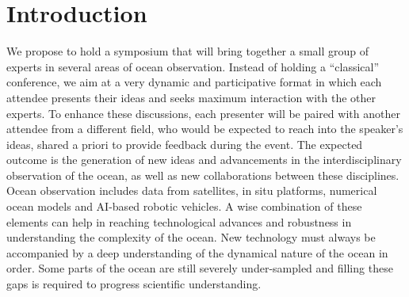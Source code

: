 \section{Introduction}

We propose to hold a symposium that will bring together a small group of
experts in several areas of ocean observation. Instead of holding a
“classical” conference, we aim at a very dynamic and participative
format in which each attendee presents their ideas and seeks maximum
interaction with the other experts. To enhance these discussions, each
presenter will be paired with another attendee from a different field,
who would be expected to reach into the speaker’s ideas, shared a priori
to provide feedback during the event. The expected outcome is the
generation of new ideas and advancements in the interdisciplinary
observation of the ocean, as well as new collaborations between these
disciplines. Ocean observation includes data from satellites, in situ
platforms, numerical ocean models and AI-based robotic vehicles. A wise
combination of these elements can help in reaching technological
advances and robustness in understanding the complexity of the
ocean. New technology must always be accompanied by a deep understanding
of the dynamical nature of the ocean in order. Some parts of the ocean
are still severely under-sampled and filling these gaps is required to
progress scientific understanding.

